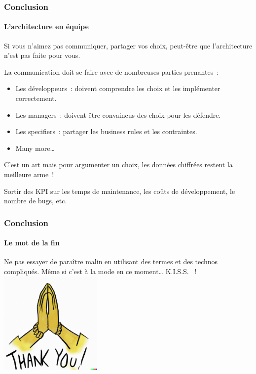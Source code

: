 \documentclass{beamer}
\begin{document}
    \begin{frame}
        \transdissolve
        \frametitle{Conclusion}
        \framesubtitle{L'architecture en équipe}
        Si vous n'aimez pas communiquer, partager vos choix, peut-être que l'architecture n'est pas faite pour vous.

        La communication doit se faire avec de nombreuses parties prenantes~:
        \begin{itemize}
            \item Les développeurs~: doivent comprendre les choix et les implémenter correctement.
            \item Les managers~: doivent être convaincus des choix pour les défendre.
            \item Les specifiers~: partager les business rules et les contraintes.
            \item Many more\ldots
        \end{itemize}
        \begin{dangercolorbox}
            C'est un art mais pour argumenter un choix, les données chiffrées restent la meilleure arme~!

            Sortir des KPI sur les temps de maintenance, les coûts de développement, le nombre de bugs, etc.
        \end{dangercolorbox}
    \end{frame}

    \begin{frame}
        \transdissolve
        \frametitle{Conclusion}
        \framesubtitle{Le mot de la fin}
        Ne pas essayer de paraître malin en utilisant des termes et des technos compliqués.
        Même si c'est à la mode en ce moment\ldots
        \bigbreak
        \centering
        K.I.S.S. ~!
        \bigbreak
        \includegraphics[width=5cm]{image/thank-you}
    \end{frame}
\end{document}
